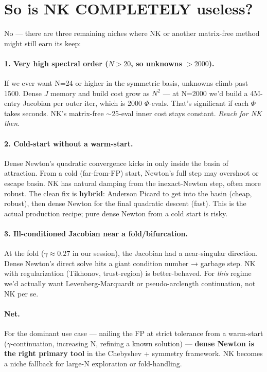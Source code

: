 \documentclass[11pt]{article}
\begin{document}
\section{So is NK COMPLETELY useless?}

No — there are three remaining niches where NK or another matrix-free method
might still earn its keep:

\paragraph{1. Very high spectral order ($N > 20$, so unknowns $> 2000$).}
If we ever want N=24 or higher in the symmetric basis, unknowns climb past
1500. Dense $J$ memory and build cost grow as $N^2$ — at N=2000 we'd build
a 4M-entry Jacobian per outer iter, which is 2000 $\Phi$-evals. That's
significant if each $\Phi$ takes seconds. NK's matrix-free $\sim$25-eval inner
cost stays constant. \emph{Reach for NK then.}

\paragraph{2. Cold-start without a warm-start.}
Dense Newton's quadratic convergence kicks in only inside the basin of
attraction. From a cold (far-from-FP) start, Newton's full step may
overshoot or escape basin. NK has natural damping from the inexact-Newton
step, often more robust. The clean fix is \textbf{hybrid}: Anderson Picard
to get into the basin (cheap, robust), then dense Newton for the final
quadratic descent (fast). This is the actual production recipe; pure dense
Newton from a cold start is risky.

\paragraph{3. Ill-conditioned Jacobian near a fold/bifurcation.}
At the fold ($\gamma \approx 0.27$ in our session), the Jacobian had a
near-singular direction. Dense Newton's direct solve hits a giant condition
number → garbage step. NK with regularization (Tikhonov, trust-region) is
better-behaved. For \emph{this} regime we'd actually want
Levenberg-Marquardt or pseudo-arclength continuation, not NK per se.

\paragraph{Net.} For the dominant use case — nailing the FP at strict
tolerance from a warm-start ($\gamma$-continuation, increasing N, refining a
known solution) — \textbf{dense Newton is the right primary tool} in the
Chebyshev + symmetry framework. NK becomes a niche fallback for large-N
exploration or fold-handling.
\end{document}
